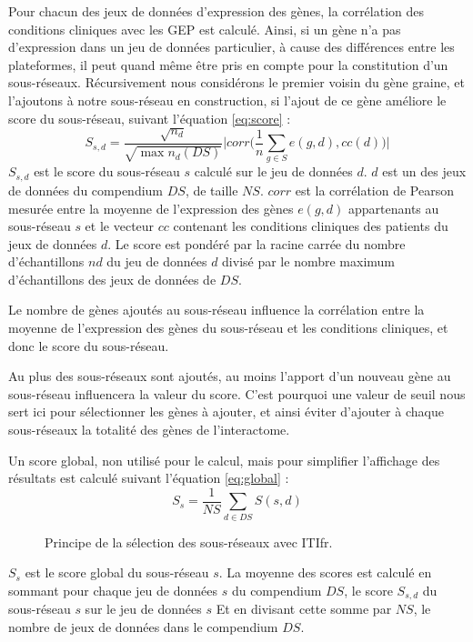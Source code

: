 			Pour chacun des jeux de données d'expression des gènes, la corrélation des conditions cliniques avec les \acs{GEP} est calculé.
			Ainsi, si un gène n'a pas d'expression dans un jeu de données particulier, à cause des différences entre les plateformes, il peut quand même être pris en compte pour la constitution d'un sous-réseaux.
			Récursivement nous considérons le premier voisin du gène graine, et l'ajoutons à notre sous-réseau en construction, si l'ajout de ce gène améliore le score du sous-réseau, suivant l'équation \ref{eq:score} :
				\begin{equation}\label{eq:score}
					S_{s,d}=\frac{\sqrt{n_{d}}}{\sqrt{\max n_{d}(DS)}}\Bigg|corr\Bigg(\frac{1}{n}\sum_{g\in S}e(g,d),cc(d)\Bigg)\Bigg|
				\end{equation}
			$S_{s,d}$ est le score du sous-réseau $s$ calculé sur le jeu de données $d$.
			$d$ est un des jeux de données du compendium $DS$, de taille $NS$.
			$corr$ est la corrélation de Pearson mesurée entre la moyenne de l'expression des gènes $e(g,d)$ appartenants au sous-réseau $s$ et le vecteur $cc$ contenant les conditions cliniques des patients du jeux de données $d$.
			Le score est pondéré par la racine carrée du nombre d'échantillons $nd$ du jeu de données $d$ divisé par le nombre maximum d'échantillons des jeux de données de $DS$.
	
			Le nombre de gènes ajoutés au sous-réseau influence la corrélation entre la moyenne de l'expression des gènes du sous-réseau et les conditions cliniques, et donc le score du sous-réseau.

			Au plus des sous-réseaux sont ajoutés, au moins l'apport d'un nouveau gène au sous-réseau influencera la valeur du score.
			C'est pourquoi une valeur de seuil nous sert ici pour sélectionner les gènes à ajouter, et ainsi éviter d'ajouter à chaque sous-réseaux la totalité des gènes de l'interactome.

			Un score global, non utilisé pour le calcul, mais pour simplifier l'affichage des résultats est calculé suivant l'équation \ref{eq:global} :
			\begin{equation}\label{eq:global}
				S_{s}=\frac{1}{NS}\sum_{d\in DS}S(s,d)
			\end{equation}

			\begin{figure}
				\begin{center}
					\def\svgwidth{\columnwidth}
					\caption{Principe de la sélection des sous-réseaux avec \acl{ITIfr}.}
					\label{fig:Algorithme}
				\end{center}
			\end{figure}
			$S_{s}$ est le score global du sous-réseau $s$.
			La moyenne des scores est calculé en sommant pour chaque jeu de données $s$ du compendium $DS$, le score $S_{s,d}$ du sous-réseau $s$ sur le jeu de données $s$
			Et en divisant cette somme par $NS$, le nombre de jeux de données dans le compendium $DS$.
		
